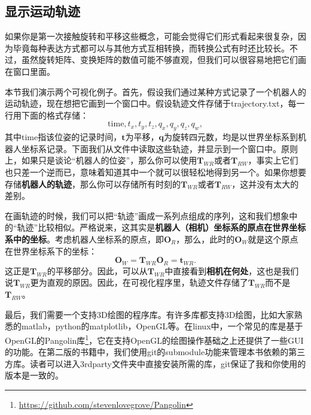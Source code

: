 \subsection{显示运动轨迹}
如果你是第一次接触旋转和平移这些概念，可能会觉得它们形式看起来很复杂，因为毕竟每种表达方式都可以与其他方式互相转换，而转换公式有时还比较长。不过，虽然旋转矩阵、变换矩阵的数值可能不够直观，但我们可以很容易地把它们画在窗口里面。

本节我们演示两个可视化例子。首先，假设我们通过某种方式记录了一个机器人的运动轨迹，现在想把它画到一个窗口中。假设轨迹文件存储于trajectory.txt，每一行用下面的格式存储：$$\mathrm{time}, t_x, t_y, t_z, q_x, q_y, q_z, q_w,$$其中$\mathrm{time}$指该位姿的记录时间，$\bm{t}$为平移，$\bm{q}$为旋转四元数，均是以世界坐标系到机器人坐标系记录。下面我们从文件中读取这些轨迹，并显示到一个窗口中。原则上，如果只是谈论“机器人的位姿”，那么你可以使用$\bm{T}_{WR}$或者$\bm{T}_{RW}$，事实上它们也只差一个逆而已，意味着知道其中一个就可以很轻松地得到另一个。如果你想要存储\textbf{机器人的轨迹}，那么你可以存储所有时刻的$\bm{T}_{WR}$或者$\bm{T}_{RW}$，这并没有太大的差别。

在画轨迹的时候，我们可以把“轨迹”画成一系列点组成的序列，这和我们想象中的“轨迹”比较相似。严格说来，这其实是\textbf{机器人（相机）坐标系的原点在世界坐标系中的坐标}。考虑机器人坐标系的原点，即$\bm{O}_{R}$，那么，此时的$\bm{O}_{W}$就是这个原点在世界坐标系下的坐标：
\begin{equation}
\bm{O}_{W} = \bm{T}_{WR} \bm{O}_R = \bm{t}_{WR}.
\end{equation}
这正是$\bm{T}_{WR}$的平移部分。因此，可以从$\bm{T}_{WR}$中直接看到\textbf{相机在何处}，这也是我们说$\bm{T}_{WR}$更为直观的原因。因此，在可视化程序里，轨迹文件存储了$\bm{T}_{WR}$而不是$\bm{T}_{RW}$。

最后，我们需要一个支持3D绘图的程序库。有许多库都支持3D绘图，比如大家熟悉的matlab，python的matplotlib，OpenGL等。在linux中，一个常见的库是基于OpenGL的Pangolin库\footnote{\url{https://github.com/stevenlovegrove/Pangolin}}，它在支持OpenGL的绘图操作基础之上还提供了一些GUI的功能。在第二版的书籍中，我们使用git的submodule功能来管理本书依赖的第三方库。读者可以进入3rdparty文件夹中直接安装所需的库，git保证了我和你使用的版本是一致的。

